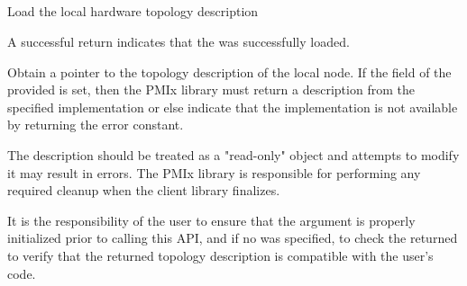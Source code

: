 \subsection{}

\summary

Load the local hardware topology description

\format


\begin{arglist}
\end{arglist}

A successful return indicates that the  was successfully loaded.

\returnsimple

\descr

Obtain a pointer to the topology description of the local node. If the
 field of the provided  is set, then
the \ac{PMIx} library must return a description from the specified
implementation or else indicate that the implementation is not available by
returning the  error constant.

The description should be treated as a "read-only" object and attempts to modify it may result in errors.
The \ac{PMIx} library is responsible for performing any required cleanup when the client library finalizes.

\adviceuserstart
It is the responsibility of the user to ensure that the  argument
is properly initialized prior to calling this \ac{API}, and if no  was specified, to check the
returned  to verify that the returned topology description is
compatible with the user's code.
\adviceuserend

\subsection{}

\summary

